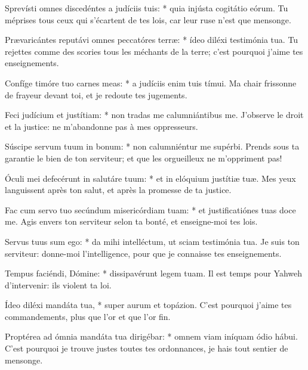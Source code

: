 \begin{paracol}{2}
\LigneParacol
{Sprevísti omnes discedéntes a judíciis tuis: * quia injústa cogitátio eórum.}
{Tu méprises tous ceux qui s'écartent de tes lois, car leur ruse n'est que mensonge.}

\LigneParacol
{Prævaricántes reputávi omnes peccatóres terræ: * ídeo diléxi testimónia tua.}
{Tu rejettes comme des scories tous les méchants de la terre; c'est pourquoi j'aime tes enseignements.}

\LigneParacol
{Confíge timóre tuo carnes meas: * a judíciis enim tuis tímui.}
{Ma chair frissonne de frayeur devant toi, et je redoute tes jugements. }

\LigneParacol
{Feci judícium et justítiam: * non tradas me calumniántibus me.}
{J'observe le droit et la justice: ne m'abandonne pas à mes oppresseurs.}

\LigneParacol
{Súscipe servum tuum in bonum: * non calumniéntur me supérbi.}
{Prends sous ta garantie le bien de ton serviteur; et que les orgueilleux ne m'oppriment pas!}

\LigneParacol
{Óculi mei defecérunt in salutáre tuum: * et in elóquium justítiæ tuæ.}
{Mes yeux languissent après ton salut, et après la promesse de ta justice.}

\LigneParacol
{Fac cum servo tuo secúndum misericórdiam tuam: * et justificatiónes tuas doce me.}
{Agis envers ton serviteur selon ta bonté, et enseigne-moi tes lois.}

\LigneParacol
{Servus tuus sum ego: * da mihi intelléctum, ut sciam testimónia tua.}
{Je suis ton serviteur: donne-moi l'intelligence, pour que je connaisse tes enseignements.}

\LigneParacol
{Tempus faciéndi, Dómine: * dissipavérunt legem tuam.}
{Il est temps pour Yahweh d'intervenir: ils violent ta loi.}

\LigneParacol
{Ídeo diléxi mandáta tua, * super aurum et topázion.}
{C'est pourquoi j'aime tes commandements, plus que l'or et que l'or fin.}

\LigneParacol
{Proptérea ad ómnia mandáta tua dirigébar: * omnem viam iníquam ódio hábui.}
{C'est pourquoi je trouve justes toutes tes ordonnances, je hais tout sentier de mensonge.  }

\end{paracol}
